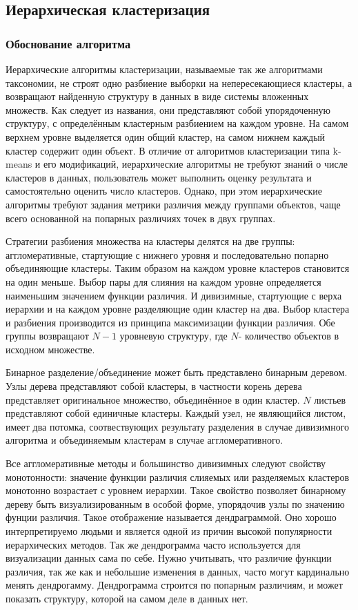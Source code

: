 \subsection{Иерархическая кластеризация}

\subsubsection{Обоснование алгоритма}

Иерархические алгоритмы кластеризации, называемые так же алгоритмами таксономии, не строят одно разбиение выборки на непересекающиеся кластеры, а возвращают найденную структуру в данных в виде системы вложенных множеств. Как следует из названия, они представляют собой упорядоченную структуру, с определённым кластерным разбиением на каждом уровне. На самом верхнем уровне выделяется один общий кластер, на самом нижнем каждый кластер содержит один объект. В отличие от алгоритмов кластеризации типа k-means и его модификаций, иерархические алгоритмы не требуют знаний о числе кластеров в данных, пользователь может выполнить оценку результата и самостоятельно оценить число кластеров. Однако, при этом иерархические алгоритмы требуют задания метрики различия между группами объектов, чаще всего основанной на попарных различиях точек в двух группах. 

Стратегии разбиения множества на кластеры делятся на две группы: аггломеративные, стартующие с нижнего уровня и последовательно попарно объединяющие кластеры. Таким образом на каждом уровне кластеров становится на один меньше. Выбор пары для слияния на каждом уровне определяется наименьшим значением функции различия. И дивизимные, стартующие с верха иерархии и на каждом уровне разделяющие один кластер на два. Выбор кластера и разбиения производится из принципа максимизации функции различия. Обе группы возвращают $N-1$ уровневую структуру, где $N$- количество объектов в исходном множестве.

Бинарное разделение/объединение может быть представлено бинарным деревом. Узлы дерева представляют собой кластеры, в частности корень дерева представляет оригинальное множество, объединённое в один кластер. $N$ листьев представляют собой единичные кластеры. Каждый узел, не являющийся листом, имеет два потомка, соотвествующих результату разделения в случае дивизимного алгоритма и объединяемым кластерам в случае аггломеративного. 

Все аггломеративные методы и большинство дивизимных следуют свойству монотонности: значение функции различия слияемых или разделяемых кластеров монотонно возрастает с уровнем иерархии. Такое свойство позволяет бинарному дереву быть визуализированным в особой форме, упорядочив узлы по значению фунции различия. Такое отображение называется дендраграммой. Оно хорошо интерпретируемо людьми и является одной из причин высокой популярности иерархических методов. Так же дендрограмма часто используется для визуализации данных сама по себе. Нужно учитывать, что различие функции различия, так же как и небольшие изменения в данных, часто могут кардинально менять дендрогамму. Дендрограмма строится по попарным различиям, и может показать структуру, которой на самом деле в данных нет.

